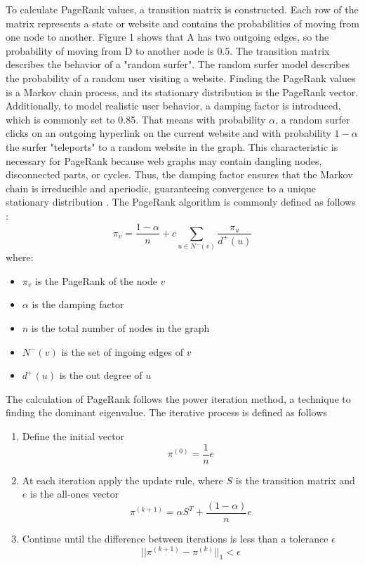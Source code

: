 To calculate PageRank values, a transition matrix is constructed. Each row of the matrix represents a state or website and contains the probabilities of moving from one node to another. Figure 1 shows that A has two outgoing edges, so the probability of moving from D to another node is $0.5$. The transition matrix describes the behavior of a "random surfer". The random surfer model describes the probability of a random user visiting a website. Finding the PageRank values is a Markov chain process, and its stationary distribution is the PageRank vector. Additionally, to model realistic user behavior, a damping factor is introduced, which is commonly set to 0.85. That means with probability $\alpha$, a random surfer clicks on an outgoing hyperlink on the current website and with probability $1-\alpha$ the surfer "teleports" to a random website in the graph. This characteristic is necessary for PageRank because web graphs may contain dangling nodes, disconnected parts, or cycles. Thus, the damping factor ensures that the Markov chain is irreducible and aperiodic, guaranteeing convergence to a unique stationary distribution \cite{langville_googles_2012}. 
The PageRank algorithm is commonly defined as follows \cite{chebolu_pagerank_2008}:
\begin{equation}
    \pi_v = \frac{1-\alpha}{n}+c\sum_{u\in N^-(v)}\frac{\pi_u}{d^+(u)} 
\end{equation} 
where: 
\begin{itemize}
    \item $\pi_v$ is the PageRank of the node $v$
    \item $\alpha$ is the damping factor
    \item $n$ is the total number of nodes in the graph
    \item $N^-(v)$ is the set of ingoing edges of $v$
    \item $d^+(u)$ is the out degree of $u$
\end{itemize} 
The calculation of PageRank follows the power iteration method, a technique to finding the dominant eigenvalue. The iterative process is defined as follows
\begin{enumerate}
    \item Define the initial vector 
    \begin{equation}
        \pi^{(0)}=\frac{1}{n}e
    \end{equation}
    \item At each iteration apply the update rule, where $S$ is the transition matrix and $e$ is the all-ones vector
    \begin{equation}
        \pi^{(k+1)} = \alpha S^T+ \frac{(1-\alpha)}{n}e
    \end{equation}
    \item Continue until the difference between iterations is less than a tolerance $\epsilon$
    \begin{equation}
        ||\pi^{(k+1)}-\pi^{(k)}||_1<\epsilon 
    \end{equation}
    
\end{enumerate}

